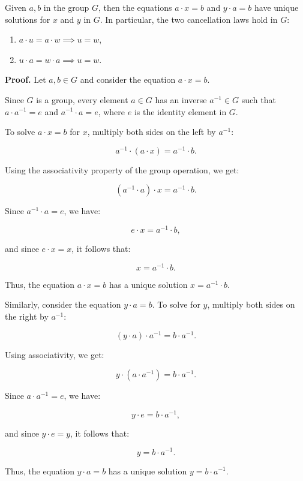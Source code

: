 \begin{lemma}
Given \( a, b \) in the group \( G \), then the equations \( a \cdot x = b \) and \( y \cdot a = b \) have unique solutions for \( x \) and \( y \) in \( G \). In particular, the two cancellation laws hold in \( G \):
\begin{enumerate}
    \item \( a \cdot u = a \cdot w \implies u = w \),
    \item \( u \cdot a = w \cdot a \implies u = w \).
\end{enumerate}
\end{lemma}
\textbf{Proof.}
Let \( a, b \in G \) and consider the equation \( a \cdot x = b \).

Since \( G \) is a group, every element \( a \in G \) has an inverse \( a^{-1} \in G \) such that \( a \cdot a^{-1} = e \) and \( a^{-1} \cdot a = e \), where \( e \) is the identity element in \( G \).

To solve \( a \cdot x = b \) for \( x \), multiply both sides on the left by \( a^{-1} \):

\[
a^{-1} \cdot (a \cdot x) = a^{-1} \cdot b.
\]

Using the associativity property of the group operation, we get:

\[
(a^{-1} \cdot a) \cdot x = a^{-1} \cdot b.
\]

Since \( a^{-1} \cdot a = e \), we have:

\[
e \cdot x = a^{-1} \cdot b,
\]

and since \( e \cdot x = x \), it follows that:

\[
x = a^{-1} \cdot b.
\]

Thus, the equation \( a \cdot x = b \) has a unique solution \( x = a^{-1} \cdot b \).

Similarly, consider the equation \( y \cdot a = b \). To solve for \( y \), multiply both sides on the right by \( a^{-1} \):

\[
(y \cdot a) \cdot a^{-1} = b \cdot a^{-1}.
\]

Using associativity, we get:

\[
y \cdot (a \cdot a^{-1}) = b \cdot a^{-1}.
\]

Since \( a \cdot a^{-1} = e \), we have:

\[
y \cdot e = b \cdot a^{-1},
\]

and since \( y \cdot e = y \), it follows that:

\[
y = b \cdot a^{-1}.
\]

Thus, the equation \( y \cdot a = b \) has a unique solution \( y = b \cdot a^{-1} \).

